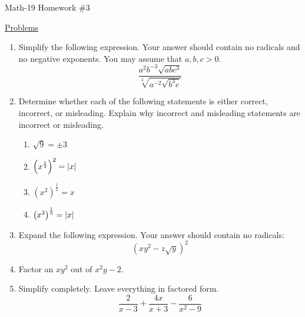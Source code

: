 \documentclass[letterpaper,12pt,fleqn]{article}
\begin{document}
\begin{center}
\Large Math-19 Homework \#3
\end{center}

\vspace{0.5in}

\underline{Problems}

\begin{enumerate}
\item Simplify the following expression. Your answer should contain no
  radicals and no negative exponents. You may assume that $a,b,c>0$.
  \[\frac{a^2b^{-3}\sqrt{abc^3}}{\sqrt[3]{a^{-2}\sqrt{b^3c}}}\]

\item Determine whether each of the following statements is either correct,
  incorrect, or misleading. Explain why incorrect and misleading statements are
  incorrect or misleading.
  \begin{enumerate}
  \item $\sqrt{9}=\pm3$
  \item $\left(x^{\frac{1}{2}}\right)^2=\lvert x\rvert$
  \item $\left(x^2\right)^{\frac{1}{2}}=x$
  \item $\left(x^3\right)^{\frac{1}{3}}=\lvert x\rvert$
  \end{enumerate}

\item Expand the following expression. Your answer should contain no radicals:
  \[(xy^2-z\sqrt{y})^2\]

\item Factor an $xy^2$ out of $x^2y-2$.

\item Simplify completely. Leave everything in factored form.
  \[\frac{2}{x-3}+\frac{4x}{x+3}-\frac{6}{x^2-9}\]
  
\end{enumerate}
\end{document}
